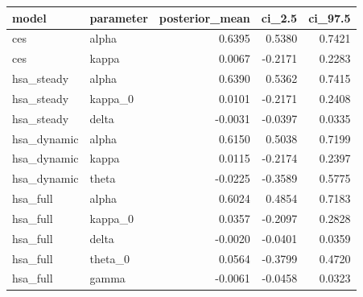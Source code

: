 \begin{tabular}{llrrr}
\toprule
model & parameter & posterior\_mean & ci\_2.5 & ci\_97.5 \\
\midrule
ces & alpha & 0.6395 & 0.5380 & 0.7421 \\
ces & kappa & 0.0067 & -0.2171 & 0.2283 \\
hsa\_steady & alpha & 0.6390 & 0.5362 & 0.7415 \\
hsa\_steady & kappa\_0 & 0.0101 & -0.2171 & 0.2408 \\
hsa\_steady & delta & -0.0031 & -0.0397 & 0.0335 \\
hsa\_dynamic & alpha & 0.6150 & 0.5038 & 0.7199 \\
hsa\_dynamic & kappa & 0.0115 & -0.2174 & 0.2397 \\
hsa\_dynamic & theta & -0.0225 & -0.3589 & 0.5775 \\
hsa\_full & alpha & 0.6024 & 0.4854 & 0.7183 \\
hsa\_full & kappa\_0 & 0.0357 & -0.2097 & 0.2828 \\
hsa\_full & delta & -0.0020 & -0.0401 & 0.0359 \\
hsa\_full & theta\_0 & 0.0564 & -0.3799 & 0.4720 \\
hsa\_full & gamma & -0.0061 & -0.0458 & 0.0323 \\
\bottomrule
\end{tabular}
